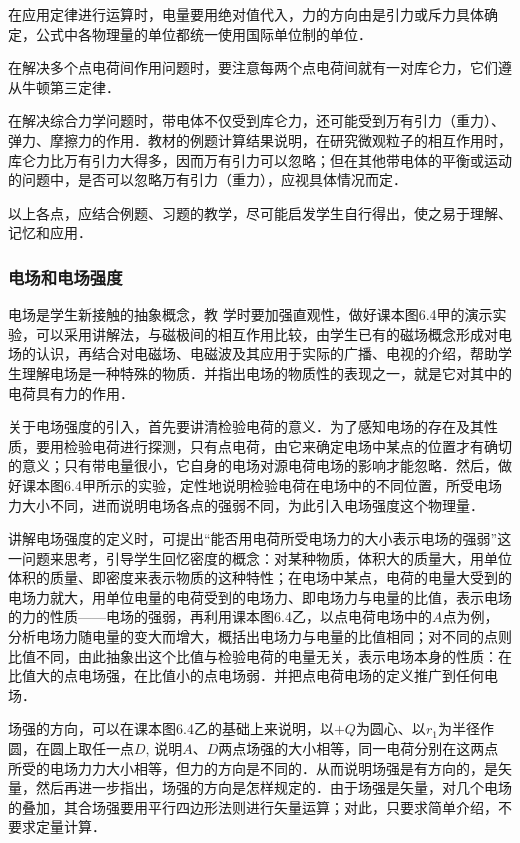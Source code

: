 在应用定律进行运算时，电量要用绝对值代入，力的方向由是引力或斥力具体确定，公式中各物理量的单位都统一使用国际单位制的单位．

在解决多个点电荷间作用问题时，要注意每两个点电荷间就有一对库仑力，它们遵从牛顿第三定律．

在解决综合力学问题时，带电体不仅受到库仑力，还可能受到万有引力（重力）、弹力、摩擦力的作用．教材的例题计算结果说明，在研究微观粒子的相互作用时，库仑力比万有引力大得多，因而万有引力可以忽略；但在其他带电体的平衡或运动的问题中，是否可以忽略万有引力（重力），应视具体情况而定．

以上各点，应结合例题、习题的教学，尽可能启发学生自行得出，使之易于理解、记忆和应用．

\subsubsection{电场和电场强度}

电场是学生新接触的抽象概念，教
学时要加强直观性，做好课本图6.4甲的演示实验，可以采用讲解法，与磁极间的相互作用比较，由学生已有的磁场概念形成对电场的认识，再结合对电磁场、电磁波及其应用于实际的广播、电视的介绍，帮助学生理解电场是一种特殊的物质．并指出电场的物质性的表现之一，就是它对其中的电荷具有力的作用．

关于电场强度的引入，首先要讲清检验电荷的意义．为了感知电场的存在及其性质，要用检验电荷进行探测，只有点电荷，由它来确定电场中某点的位置才有确切的意义；只有带电量很小，它自身的电场对源电荷电场的影响才能忽略．然后，做好课本图6.4甲所示的实验，定性地说明检验电荷在电场中的不同位置，所受电场力大小不同，进而说明电场各点的强弱不同，为此引入电场强度这个物理量．

讲解电场强度的定义时，可提出“能否用电荷所受电场力的大小表示电场的强弱”这一问题来思考，引导学生回忆密度的概念：对某种物质，体积大的质量大，用单位体积的质量、即密度来表示物质的这种特性；在电场中某点，电荷的电量大受到的电场力就大，用单位电量的电荷受到的电场力、即电场力与电量的比值，表示电场的力的性质——电场的强弱，再利用课本图6.4乙，以点电荷电场中的$A$点为例，分析电场力随电量的变大而增大，概括出电场力与电量的比值相同；对不同的点则比值不同，由此抽象出这个比值与检验电荷的电量无关，表示电场本身的性质：在比值大的点电场强，在比值小的点电场弱．并把点电荷电场的定义推广到任何电场．

场强的方向，可以在课本图6.4乙的基础上来说明，以$+Q$为圆心、以$r_1$为半径作圆，在圆上取任一点$D$, 说明$A$、$D$两点场强的大小相等，同一电荷分别在这两点所受的电场力力大小相等，但力的方向是不同的．从而说明场强是有方向的，是矢量，然后再进一步指出，场强的方向是怎样规定的．由于场强是矢量，对几个电场的叠加，其合场强要用平行四边形法则进行矢量运算；对此，只要求简单介绍，不要求定量计算．

